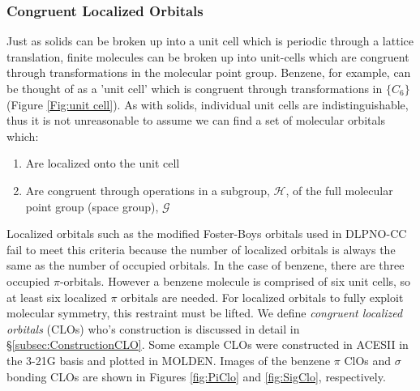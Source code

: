 \documentclass[letterpaper, 12pt]{article}
\begin{document}
\subsubsection{Congruent Localized Orbitals}
Just as solids can be broken up into a unit cell which is periodic through a lattice translation, finite molecules can be broken up into unit-cells which are congruent through transformations in the molecular point group. Benzene, for example, can be thought of as a  'unit cell' which is congruent through transformations in $\{C_{6}\}$ (Figure \ref{Fig:unit cell}). As with solids, individual unit cells are indistinguishable, thus it is not unreasonable to assume we can find a set of molecular orbitals which:
\begin{enumerate}
\item Are localized onto the unit cell
\item Are congruent through operations in a subgroup, $\mathcal{H}$, of the full molecular point group (space group), $\mathcal{G}$
\end{enumerate}
Localized orbitals such as the modified Foster-Boys orbitals used in DLPNO-CC fail to meet this criteria because the number of localized orbitals is always the same as the number of occupied orbitals. In the case of benzene, there are three occupied $\pi$-orbitals. However a benzene molecule is comprised of six unit cells, so at least six localized $\pi$ orbitals are needed. For localized orbitals to fully exploit molecular symmetry, this restraint must be lifted.  We define \textit{congruent localized orbitals} (CLOs) who's construction is discussed in detail in \S \ref{subsec:ConstructionCLO}. Some example CLOs were constructed in ACESII in the 3-21G basis and plotted in MOLDEN. Images of the benzene $\pi$ ClOs and  $\sigma$ bonding CLOs are shown in Figures \ref{fig:PiClo} and \ref{fig:SigClo}, respectively. \\
\end{document}
